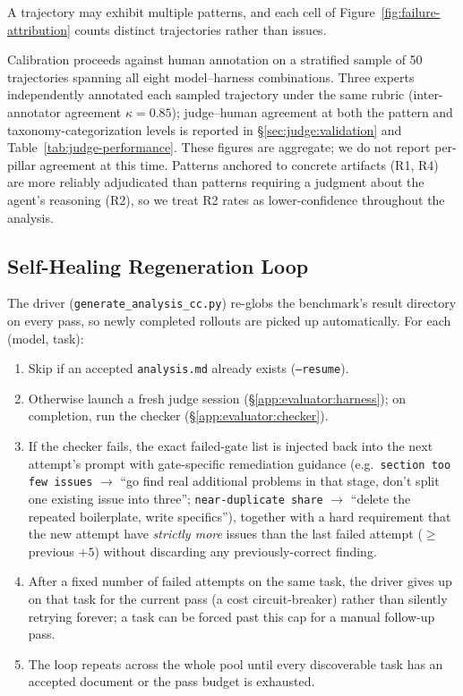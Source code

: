 A trajectory may exhibit multiple patterns, and each cell of
Figure~\ref{fig:failure-attribution} counts distinct trajectories rather
than issues.

Calibration proceeds against human annotation on a stratified sample of
50 trajectories spanning all eight model--harness combinations. Three
experts independently annotated each sampled trajectory under the same
rubric (inter-annotator agreement $\kappa = 0.85$); judge--human
agreement at both the pattern and taxonomy-categorization levels is
reported in \S\ref{sec:judge:validation} and
Table~\ref{tab:judge-performance}. These figures are aggregate; we do not
report per-pillar agreement at this time. Patterns anchored to concrete artifacts
(R1, R4) are more reliably adjudicated than patterns requiring a
judgment about the agent's reasoning (R2), so we treat R2 rates as
lower-confidence throughout the analysis.

\subsection{Self-Healing Regeneration Loop}
\label{app:evaluator:loop}

The driver (\texttt{generate\_analysis\_cc.py}) re-globs the benchmark's
result directory on every pass, so newly completed rollouts are picked up
automatically. For each (model, task):

\begin{enumerate}
  \item Skip if an accepted \texttt{analysis.md} already exists
  (\texttt{--resume}).

  \item Otherwise launch a fresh judge session
  (\S\ref{app:evaluator:harness}); on completion, run the checker
  (\S\ref{app:evaluator:checker}).

  \item If the checker fails, the exact failed-gate list is injected back
  into the next attempt's prompt with gate-specific remediation guidance
  (e.g.\ \texttt{section too few issues} $\to$ ``go find real additional
  problems in that stage, don't split one existing issue into three'';
  \texttt{near-duplicate share} $\to$ ``delete the repeated boilerplate,
  write specifics''), together with a hard requirement that the new
  attempt have \emph{strictly more} issues than the last failed attempt
  ($\geq$ previous $+5$) without discarding any previously-correct
  finding.

  \item After a fixed number of failed attempts on the same task, the
  driver gives up on that task for the current pass (a cost
  circuit-breaker) rather than silently retrying forever; a task can be
  forced past this cap for a manual follow-up pass.

  \item The loop repeats across the whole pool until every discoverable
  task has an accepted document or the pass budget is exhausted.
\end{enumerate}

